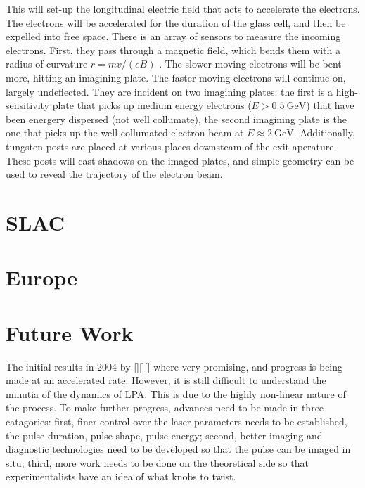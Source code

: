 \documentclass[12pt, titlepage]{caesar_book}
\begin{document}
This will set-up the longitudinal electric field that acts to accelerate the electrons. The electrons will be accelerated for the duration of the glass cell, and then be expelled into free space.  
There is an array of sensors to measure the incoming electrons. First, they pass
through a magnetic field, which bends them with a radius of curvature $ r = mv/(eB)$ . The slower moving electrons will be bent more, hitting an imagining plate. The faster moving electrons will continue on, largely undeflected. They are incident on two imagining plates: the first is a high-sensitivity plate that picks up medium energy electrons ($E >\SI{0.5}{\giga\electronvolt}$) that have been energery dispersed (not well collumate), the
second imagining plate is the one that picks up the well-collumated electron beam at $E \approx \SI{2}{\giga\electronvolt}$. Additionally, tungsten posts are placed at various places downsteam of the exit aperature. These posts will
cast shadows on the imaged plates, and simple geometry can be used to reveal
the trajectory of the electron beam.

\section{SLAC}

\section{Europe}

\section{Future Work}

The initial results in 2004 by [][][] where very promising, and progress is being made at an accelerated rate. However, it is still difficult to understand the minutia of the dynamics of LPA. This is due to the highly non-linear nature of the process. To make further progress, advances need to be made in three catagories: first, finer control over the laser parameters needs to be established, the pulse duration, pulse shape, pulse energy; second, better imaging and
diagnostic technologies need to be developed so that the pulse can be imaged in situ; third, more work needs to be done on the theoretical side so that experimentalists have an idea of what knobs to twist.
\end{document}

